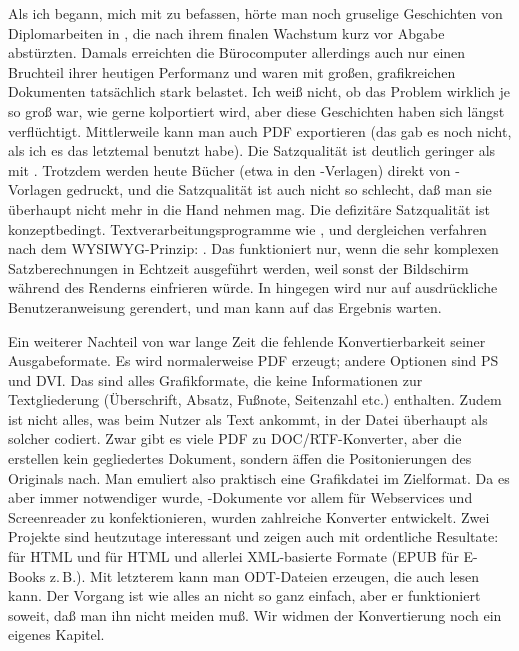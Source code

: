 \documentclass[
	11pt,        %
	table,       %
	twoside,     %
	notitlepage, %
]{scrreprt}
\begin{document}
Als ich begann, mich mit \LaTeXi{} zu befassen, hörte man noch gruselige Geschichten von Diplomarbeiten in , die nach ihrem finalen Wachstum kurz vor Abgabe abstürzten. Damals erreichten die Bürocomputer allerdings auch nur einen Bruchteil ihrer heutigen Performanz und waren mit großen, grafikreichen Dokumenten tatsächlich stark belastet. Ich weiß nicht, ob das Problem wirklich je so groß war, wie gerne kolportiert wird, aber diese Geschichten haben sich längst verflüchtigt. Mittlerweile kann man auch PDF exportieren (das gab es noch nicht, als ich es das letztemal benutzt habe). Die Satzqualität ist deutlich geringer als mit \LaTeXi. Trotzdem werden heute Bücher (etwa in den -Verlagen) direkt von -Vorlagen gedruckt, und die Satzqualität ist auch nicht so schlecht, daß man sie überhaupt nicht mehr in die Hand nehmen mag. Die defizitäre Satzqualität ist konzeptbedingt. Textverarbeitungsprogramme wie ,  und dergleichen verfahren nach dem WYSIWYG-Prinzip: . Das funktioniert nur, wenn die sehr komplexen Satzberechnungen in Echtzeit ausgeführt werden, weil sonst der Bildschirm während des Renderns einfrieren würde. In \LaTeXi{} hingegen wird nur auf ausdrückliche Benutzeranweisung gerendert, und man kann auf das Ergebnis warten.

Ein weiterer Nachteil von \LaTeXi{} war lange Zeit die fehlende Konvertierbarkeit seiner Ausgabeformate. Es wird normalerweise PDF erzeugt; andere Optionen sind PS und DVI. Das sind alles Grafikformate, die keine Informationen zur Textgliederung (Überschrift, Absatz, Fußnote, Seitenzahl etc.) enthalten. Zudem ist nicht alles, was beim Nutzer als Text ankommt, in der Datei überhaupt als solcher codiert. Zwar gibt es viele PDF zu DOC/RTF-Konverter, aber die erstellen kein gegliedertes Dokument, sondern äffen die Positonierungen des Originals nach. Man emuliert also praktisch eine Grafikdatei im Zielformat. Da es aber immer notwendiger wurde, \LaTeXi{}-Dokumente vor allem für Webservices und Screenreader zu konfektionieren, wurden zahlreiche  Konverter entwickelt. Zwei Projekte sind heutzutage interessant und zeigen auch mit \archbib{} ordentliche Resultate:
\Paket{\LaTeXML{}} für HTML und  für HTML und allerlei XML-basierte Formate (EPUB für E-Books z.\,B.). Mit letzterem kann man ODT-Dateien erzeugen, die auch  lesen kann. Der Vorgang ist wie alles an \LaTeXi{} nicht so ganz einfach, aber er funktioniert soweit, daß man ihn nicht meiden muß. Wir widmen der Konvertierung noch ein eigenes Kapitel.
\end{document}
